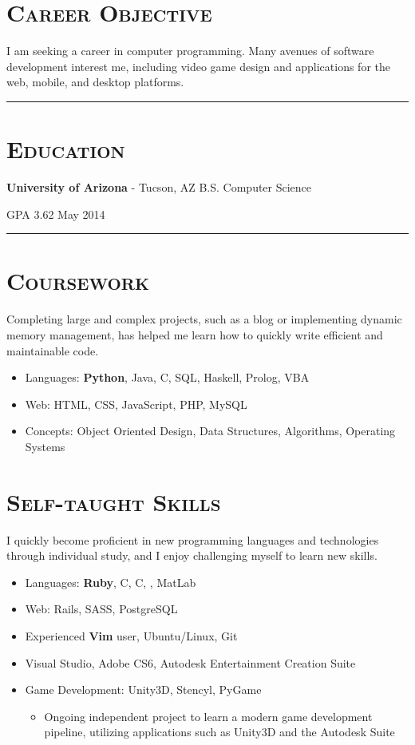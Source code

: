 \documentclass[11pt,letterpaper]{article}
\newcommand{\CPP}
{C\nolinebreak[4]\hspace{-.05em}\raisebox{.22ex}{\footnotesize\bf ++}}
\newcommand{\CS}
{C\nolinebreak[4]\hspace{-.05em}\raisebox{.22ex}{\footnotesize\bf \#}}
\newcommand{\Hsep}{\vspace{4mm} \hrule \vspace{-1mm}}
\begin{document}
\begin{minipage}{\textwidth}
\section{\scshape Career Objective}
\vspace{-2mm}
I am seeking a career in computer programming.
Many avenues of software development interest me, including video game design and applications for the web, mobile, and desktop platforms.
\Hsep

\section{\scshape Education}
{\bfseries University of Arizona} - Tucson, AZ \hfill B.S. Computer Science

GPA 3.62 \hfill May 2014

\Hsep

\section{\scshape Coursework}
\vspace{-2mm}
Completing large and complex projects, such as a blog or implementing dynamic memory management,
has helped me learn how to quickly write efficient and maintainable code.
\vspace{3mm}
\begin{itemize}
 \item Languages: {\bfseries Python}, Java, C, SQL, Haskell, Prolog, VBA
 \item Web: HTML, CSS, JavaScript, PHP, MySQL
 \item Concepts: Object Oriented Design, Data Structures, Algorithms, Operating Systems
\end{itemize}
\vspace{-3mm}
\section{\scshape Self-taught Skills}
\vspace{-2mm}
I quickly become proficient in new programming languages and technologies through individual study,
and I enjoy challenging myself to learn new skills.
\vspace{3mm}
\begin{itemize}
 \item Languages: {\bfseries Ruby}, \CPP, \CS, \textls{\LaTeX}, MatLab
 \item Web: Rails, SASS, PostgreSQL
 \item Experienced {\bfseries Vim} user, Ubuntu/Linux, Git
 \item Visual Studio, Adobe CS6, Autodesk Entertainment Creation Suite
 \item Game Development: Unity3D, Stencyl, PyGame
 \begin{itemize}
  \item Ongoing independent project to learn a modern game development pipeline, utilizing applications such as Unity3D and the Autodesk Suite
 \end{itemize}


\end{itemize}
\end{minipage}
\end{document}
